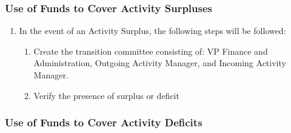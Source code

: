 \subsubsection{Use of Funds to Cover Activity Surpluses}
\label{use-of-funds-to-cover-activity-surpluses}

\begin{enumerate}
 \item
  In the event of an Activity Surplus, the following steps will be followed:

  \begin{enumerate}
   \item
    Create the transition committee consisting of: VP Finance and Administration, Outgoing Activity Manager, and Incoming Activity Manager.
   \item
    Verify the presence of surplus or deficit
  \end{enumerate}
\end{enumerate}

\subsubsection{Use of Funds to Cover Activity Deficits}
\label{use-of-funds-to-cover-activity-deficits}

